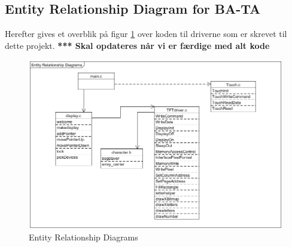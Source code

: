\subsection{Entity Relationship Diagram for BA-TA}
Herefter gives et overblik på figur \ref{fig:Entity} over koden til driverne som er skrevet til dette projekt.
\textbf{*** Skal opdateres når vi er færdige med alt kode}

\begin{figure}[H]
	\centering
	\includegraphics[width = 300 pt]{Img/Entity.png}
	\caption{Entity Relationship Diagrams}
	\label{fig:Entity}
\end{figure}

